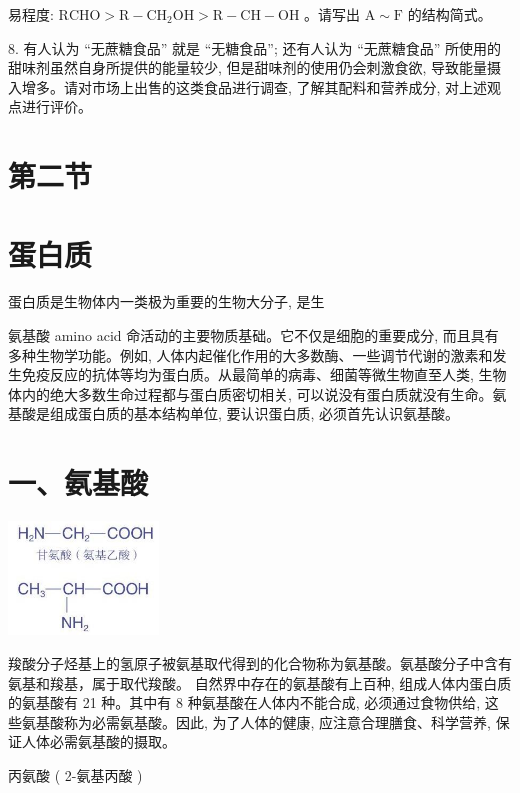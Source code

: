 \documentclass[10pt]{article}
\begin{document}
易程度: \(\mathrm{{RCHO}} > \mathrm{R} - {\mathrm{{CH}}}_{2}\mathrm{{OH}} > \mathrm{R} - \mathrm{{CH}} - \mathrm{{OH}}\) 。请写出 \(\mathrm{A} \sim \mathrm{F}\) 的结构简式。

8. 有人认为 “无蔗糖食品” 就是 “无糖食品”; 还有人认为 “无蔗糖食品” 所使用的甜味剂虽然自身所提供的能量较少, 但是甜味剂的使用仍会刺激食欲, 导致能量摄入增多。请对市场上出售的这类食品进行调查, 了解其配料和营养成分, 对上述观点进行评价。

\section*{第二节}

\section*{蛋白质}

蛋白质是生物体内一类极为重要的生物大分子, 是生

氨基酸 amino acid 命活动的主要物质基础。它不仅是细胞的重要成分, 而且具有多种生物学功能。例如, 人体内起催化作用的大多数酶、一些调节代谢的激素和发生免疫反应的抗体等均为蛋白质。从最简单的病毒、细菌等微生物直至人类, 生物体内的绝大多数生命过程都与蛋白质密切相关, 可以说没有蛋白质就没有生命。氨基酸是组成蛋白质的基本结构单位, 要认识蛋白质, 必须首先认识氨基酸。

\section*{一、氨基酸}

\begin{center}
\includegraphics[max width=0.3\textwidth]{images/0190efc5-b58a-7c43-bfb0-e0a030df9cfd_117_525984.jpg}
\end{center}

羧酸分子烃基上的氢原子被氨基取代得到的化合物称为氨基酸。氨基酸分子中含有氨基和羧基，属于取代羧酸。 自然界中存在的氨基酸有上百种, 组成人体内蛋白质的氨基酸有 21 种。其中有 8 种氨基酸在人体内不能合成, 必须通过食物供给, 这些氨基酸称为必需氨基酸。因此, 为了人体的健康, 应注意合理膳食、科学营养, 保证人体必需氨基酸的摄取。

丙氨酸 ( 2-氨基丙酸 )
\end{document}
